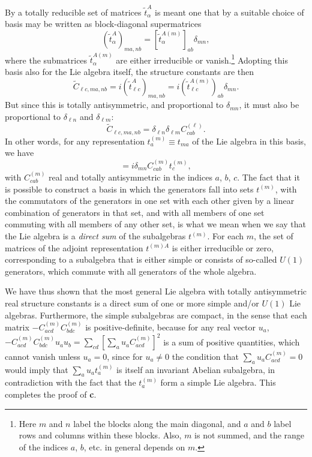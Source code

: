 By a totally reducible set of matrices $\widetilde t^A_\alpha$ is meant one that by a suitable choice of basis may be written as block-diagonal supermatrices
\begin{equation}
 (\widetilde t^A_\alpha)_{ma,nb}
 =[\widetilde t^{A(m)}_\alpha]_{ab}\delta_{mn},
 \tag{15.A.6}\label{eq:15.A.6}
\end{equation}
where the submatrices $\widetilde t^{A(m)}_\alpha$ are either irreducible or vanish.\footnote{Here $m$ and $n$ label the blocks along the main diagonal, and $a$ and $b$ label rows and columns within these blocks. Also, $m$ is not summed, and the range of the indices $a$, $b$, etc. in general depends on $m$.} Adopting this basis also for the Lie algebra itself, the structure constants are then
\begin{equation}
 \widetilde C_{\ell c,ma,nb}
 =i(\widetilde t^A_{\ell c})_{ma,nb}
 =i(\widetilde t^{A(m)}_{\ell c})_{ab}\delta_{mn}.
 \tag{15.A.7}\label{eq:15.A.7}
\end{equation}
But since this is totally antisymmetric, and proportional to $\delta_{mn}$, it must also be proportional to $\delta_{\ell n}$ and $\delta_{\ell m}$:
\begin{equation}
 \widetilde C_{\ell c,ma,nb}
 =\delta_{\ell n}\delta_{\ell m}C^{(\ell)}_{cab}.
 \tag{15.A.8}\label{eq:15.A.8}
\end{equation}
In other words, for any representation $t_a^{(m)}\equiv t_{ma}$ of the Lie algebra in this basis, we have
\begin{equation}
 [t_a^{(m)},t_b^{(n)}]
 =i\delta_{mn}C^{(m)}_{cab}t_c^{(m)},
 \tag{15.A.9}\label{eq:15.A.9}
\end{equation}
with $C^{(m)}_{cab}$ real and totally antisymmetric in the indices $a$, $b$, $c$. The fact that it is possible to construct a basis in which the generators fall into sets $t^{(m)}$, with the commutators of the generators in one set with each other given by a linear combination of generators in that set, and with all members of one set commuting with all members of any other set, is what we mean when we say that the Lie algebra is a \emph{direct sum} of the subalgebras $t^{(m)}$. For each $m$, the set of matrices of the adjoint representation $t^{(m)A}$ is either irreducible or zero, corresponding to a subalgebra that is either simple or consists of so-called $U(1)$ generators, which commute with all generators of the whole algebra.

We have thus shown that the most general Lie algebra with totally antisymmetric real structure constants is a direct sum of one or more simple and/or $U(1)$ Lie algebras. Furthermore, the simple subalgebras are compact, in the sense that each matrix $-C^{(m)}_{acd}C^{(m)}_{bdc}$ is positive-definite, because for any real vector $u_a$, $-C^{(m)}_{acd}C^{(m)}_{bdc}u_au_b=\sum_{cd}[\sum_a u_aC^{(m)}_{acd}]^2$ is a sum of positive quantities, which cannot vanish unless $u_a=0$, since for $u_a\ne0$ the condition that $\sum_a u_aC^{(m)}_{acd}=0$ would imply that $\sum_a u_at_a^{(m)}$ is itself an invariant Abelian subalgebra, in contradiction with the fact that the $t_a^{(m)}$ form a simple Lie algebra. This completes the proof of \textbf{c}.

